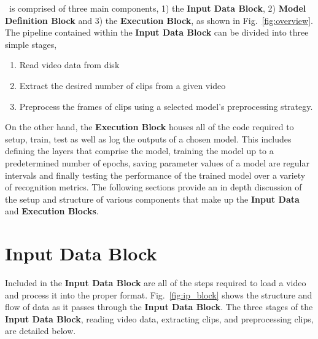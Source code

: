 \documentclass{llncs}
\begin{document}
\acro~is comprised of three main components, 1) the \textbf{Input Data Block}, 2) \textbf{Model Definition Block} and 3) the \textbf{Execution Block}, as shown in Fig.~\ref{fig:overview}.
The pipeline contained within the \textbf{Input Data Block} can be divided into three simple stages,
\begin{enumerate}
\item Read video data from disk
\item Extract the desired number of clips from a given video
\item Preprocess the frames of clips using a selected model's preprocessing strategy.
\end{enumerate}
On the other hand, the \textbf{Execution Block} houses all of the code required to setup, train, test as well as log the outputs of a chosen model.
This includes defining the layers that comprise the model, training the model up to a predetermined number of epochs, saving parameter values of a model are regular intervals and finally testing the performance of the trained model over a variety of recognition metrics.
The following sections provide an in depth discussion of the setup and structure of various components that make up the \textbf{Input Data} and \textbf{Execution Blocks}.

\section{Input Data Block}
\label{sec:ipblock}
Included in the \textbf{Input Data Block} are all of the steps required to load a video and process it into the proper format.
Fig.~\ref{fig:ip_block} shows the structure and flow of data as it passes through the \textbf{Input Data Block}.
The three stages of the \textbf{Input Data Block}, reading video data, extracting clips, and preprocessing clips, are detailed below.
\end{document}
